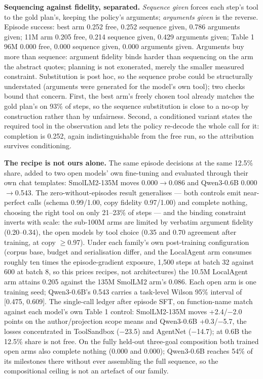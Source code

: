 \documentclass{article}
\begin{document}
\textbf{Sequencing against fidelity, separated.} \emph{Sequence given} forces each step's tool to the gold plan's, keeping the policy's arguments; \emph{arguments given} is the reverse. Episode success: best arm 0.252 free, 0.252 sequence given, 0.786 arguments given; 11M arm 0.205 free, 0.214 sequence given, 0.429 arguments given; Table 1 96M 0.000 free, 0.000 sequence given, 0.000 arguments given. Arguments buy more than sequence: argument fidelity binds harder than sequencing on the arm the abstract quotes; planning is not exonerated, merely the smaller measured constraint. Substitution is post hoc, so the sequence probe could be structurally understated (arguments were generated for the model's own tool); two checks bound that concern. First, the best arm's freely chosen tool already matches the gold plan's on 93\% of steps, so the sequence substitution is close to a no-op by construction rather than by unfairness. Second, a conditioned variant states the required tool in the observation and lets the policy re-decode the whole call for it: completion is 0.252, again indistinguishable from the free run, so the attribution survives conditioning.


\textbf{The recipe is not ours alone.} The same episode decisions at the same 12.5\% share, added to two open models' own fine-tuning and evaluated through their own chat templates: SmolLM2-135M moves 0.000$\rightarrow$0.086 and Qwen3-0.6B 0.000$\rightarrow$0.543. The zero-without-episodes result generalises --- both controls emit near-perfect calls (schema 0.99/1.00, copy fidelity 0.97/1.00) and complete nothing, choosing the right tool on only 21--23\% of steps --- and the binding constraint inverts with scale: the sub-100M arms are limited by verbatim argument fidelity (0.20--0.34), the open models by tool choice (0.35 and 0.70 agreement after training, at copy $\geq$0.97). Under each family's own post-training configuration (corpus base, budget and serialisation differ, and the LocalAgent arm consumes roughly ten times the episode-gradient exposure, 1,500 steps at batch 32 against 600 at batch 8, so this prices recipes, not architectures) the 10.5M LocalAgent arm attains 0.205 against the 135M SmolLM2 arm's 0.086. Each open arm is one training seed; Qwen3-0.6B's 0.543 carries a task-level Wilson 95\% interval of [0.475, 0.609]. The single-call ledger after episode SFT, on function-name match against each model's own Table 1 control: SmolLM2-135M moves +2.4/$-$2.0 points on the author/projection scope means and Qwen3-0.6B +0.3/$-$5.7, the losses concentrated in ToolSandbox ($-$23.5) and AgentNet ($-$14.7); at 0.6B the 12.5\% share is not free. On the fully held-out three-goal composition both trained open arms also complete nothing (0.000 and 0.000); Qwen3-0.6B reaches 54\% of its milestones there without ever assembling the full sequence, so the compositional ceiling is not an artefact of our family.
\end{document}
